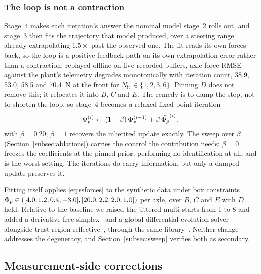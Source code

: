 \subsubsection{The loop is not a contraction}
Stage~4 makes each iteration's answer the nominal model stage~2 rolls out, and
stage~3 then fits the trajectory that model produced, over a steering range
already extrapolating $1.5\times$ past the observed one. The fit reads its own
forces back, so the loop is a positive feedback path on its own extrapolation
error rather than a contraction: replayed offline on five recorded buffers, axle
force RMSE against the plant's telemetry degrades monotonically with iteration
count, \num{38.9}, \num{53.0}, \num{58.5} and \SI{70.4}{\newton} at the front
for $N_{\mathrm{it}}\in\{1,2,3,6\}$. Pinning $D$ does not remove this; it
relocates it into $B$, $C$ and $E$. The remedy is to damp the step, not to
shorten the loop, so stage~4 becomes a relaxed fixed-point iteration
\begin{equation}
\Phi_{p}^{(i)} \leftarrow (1-\beta)\,\Phi_{p}^{(i-1)} + \beta\,\tilde{\Phi_{p}}^{(i)},
\label{eq:relax}
\end{equation}
with $\beta=\num{0.20}$; $\beta=1$ recovers the inherited update exactly. The
sweep over $\beta$ (Section~\ref{subsec:ablations}) carries the control the
contribution needs: $\beta=0$ freezes the coefficients at the pinned prior,
performing no identification at all, and is the worst setting. The iterations do
carry information, but only a damped update preserves it.

Fitting itself applies \eqref{eq:ssforces} to the synthetic data under box
constraints $\Phi_{p}\in([4.0,1.2,0.4,-3.0],[20.0,2.2,2.0,1.0])$ per axle, over
$B$, $C$ and $E$ with $D$ held. Relative to the baseline we raised the jittered
multi-starts from 1 to 8 and added a derivative-free
simplex~\cite{neldermead1965} and a global differential-evolution
solver~\cite{storn1997de} alongside trust-region
reflective~\cite{branch1999trust}, through the same
library~\cite{virtanen2020scipy}. Neither change addresses the degeneracy, and
Section~\ref{subsec:sweep} verifies both as secondary.

\subsection{Measurement-side corrections}
\label{subsec:measurement}

